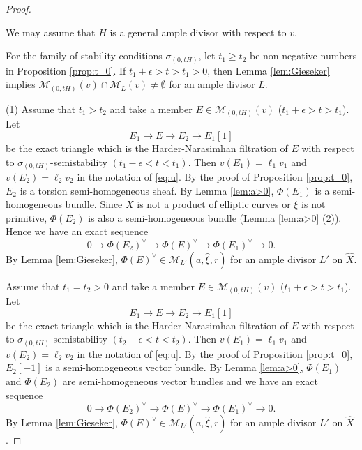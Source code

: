 \documentclass[10pt,a4paper]{amsart}
\newcommand{\cal}{\mathcal}
\begin{document}
\begin{proof}
\begin{NB}
We may assume that $H$ is a general ample divisor with respect to $v$.
\end{NB}
For the family of stability conditions
$\sigma_{(0,tH)}$, let $t_1 \geq t_2$ be non-negative numbers in Proposition \ref{prop:t_0}.
If $t_1+\epsilon> t>t_1>0$, then Lemma \ref{lem:Gieseker} implies
${\cal M}_{(0,tH)}(v) \cap {\cal M}_L(v) \ne \emptyset$ for an ample divisor $L$.

(1)
Assume that $t_1>t_2$ and take a member $E \in {\cal M}_{(0,tH)}(v)$ ($t_1+\epsilon> t>t_1$).
Let   
\begin{equation}\label{eq:HNFt1}
E_1 \to E \to E_2 \to E_1[1]
\end{equation}
be the exact triangle
which is the Harder-Narasimhan filtration of $E$ 
with respect to $\sigma_{(0,tH)}$-semistability $(t_1-\epsilon<t<t_1)$. 
Then $v(E_1)=\ell_1 v_1$ and $v(E_2)=\ell_2 v_2$ in the notation of \eqref{eq:u}.
By the proof of Proposition \ref{prop:t_0},
$E_2$ is a torsion semi-homogeneous sheaf.
By Lemma \ref{lem:a>0}, $\Phi(E_1)$ is a semi-homogeneous bundle.
Since $X$ is not a product of elliptic curves or $\xi$ is not primitive,
$\Phi(E_2)$
is also a semi-homogeneous bundle (Lemma \ref{lem:a>0} (2)).
Hence we have an exact sequence
$$
0 \to \Phi(E_2)^{\vee} \to \Phi(E)^{\vee} \to \Phi(E_1)^{\vee} \to 0.
$$
By Lemma \ref{lem:Gieseker}, 
$\Phi(E)^{\vee} \in {\cal M}_{L'}(a,\widehat{\xi},r)$ for an ample divisor $L'$ 
on $\widehat{X}$.

Assume that $t_1=t_2>0$
and take a member $E \in {\cal M}_{(0,tH)}(v)$ ($t_1+\epsilon> t>t_1$).
Let   
\begin{equation}\label{eq:HNFt0}
E_1 \to E \to E_2 \to E_1[1]
\end{equation}
be the exact triangle
which is the Harder-Narasimhan filtration of $E$ 
with respect to $\sigma_{(0,tH)}$-semistability $(t_2-\epsilon <t<t_2)$. 
Then $v(E_1)=\ell_1 v_1$ and $v(E_2)=\ell_2 v_2$ in the notation of \eqref{eq:u}.
By the proof of Proposition \ref{prop:t_0},
$E_2[-1]$ is a semi-homogeneous vector bundle.
By Lemma \ref{lem:a>0},
$\Phi(E_1) $ and $\Phi(E_2)$
are semi-homogeneous vector bundles
and we have an exact sequence
$$
0 \to \Phi(E_2)^{\vee} \to \Phi(E)^{\vee} \to \Phi(E_1)^{\vee} \to 0.
$$
By Lemma \ref{lem:Gieseker}, 
$\Phi(E)^{\vee} \in {\cal M}_{L'}(a,\widehat{\xi},r)$ for an ample divisor $L'$
on $\widehat{X}$.


\end{proof}
\end{document}
